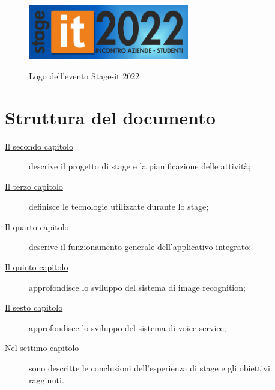 	\begin{figure}[H]
		\centering
		\includegraphics[width=7cm]{immagini/stageit.png} \\
		\caption{\label{fig:logo_stageit} Logo dell'evento Stage-it 2022}
	\end{figure}

\section{Struttura del documento}

	\begin{description}
	    \item[{\hyperref[cap:descrizione-stage]{Il secondo capitolo}}] descrive il progetto di stage e la pianificazione delle attività;
	    
		\item[{\hyperref[cap:tecnologie]{Il terzo capitolo}}] definisce le tecnologie utilizzate durante lo stage;
		
		\item[{\hyperref[cap:applicazione]{Il quarto capitolo}}] descrive il funzionamento generale dell'applicativo integrato;
	    
	    \item[{\hyperref[cap:rekognition]{Il quinto capitolo}}] approfondisce lo sviluppo del sistema di image recognition;
	    
	    \item[{\hyperref[cap:lex]{Il sesto capitolo}}] approfondisce lo sviluppo del sistema di voice service;
	   
	    \item[{\hyperref[cap:conclusioni]{Nel settimo capitolo}}] sono descritte le conclusioni dell'esperienza di stage e gli obiettivi raggiunti.
	\end{description}




